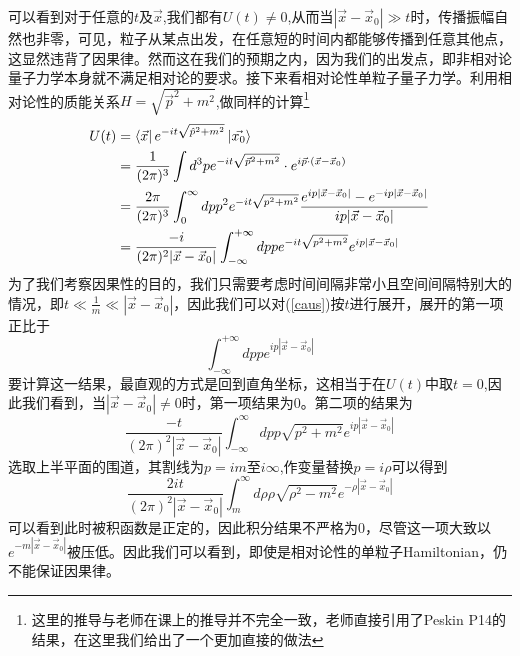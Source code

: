 可以看到对于任意的$t$及$\vec{x}$,我们都有$U(t)\neq0$,从而当$|\vec{x}-\vec{x}_{0}| \gg t$时，传播振幅自然也非零，可见，粒子从某点出发，在任意短的时间内都能够传播到任意其他点，这显然违背了因果律。然而这在我们的预期之内，因为我们的出发点，即非相对论量子力学本身就不满足相对论的要求。接下来看相对论性单粒子量子力学。利用相对论性的质能关系$H=\sqrt{\vec{p}^{2}+m^{2}}$,做同样的计算\footnote{这里的推导与老师在课上的推导并不完全一致，老师直接引用了Peskin P14的结果，在这里我们给出了一个更加直接的做法}
\begin{equation}
\label{caus}
\begin{aligned}
U(t) &=\bra{\vec{x}}e^{-it\sqrt{\hat{p}^{2}+m^{2}}}\ket{\vec{x_{0}}} \\
&=\frac{1}{(2\pi)^{3}}\int d^{3}p e^{-it\sqrt{\vec{p}^{2}+m^{2}}}\cdot e^{i\vec{p}\cdot(\vec{x}-\vec{x}_{0})} \\
&=\frac{2\pi}{(2\pi)^{3}}\int_{0}^{\infty}dp p^{2}  e^{-it\sqrt{p^{2}+m^{2}}} \frac{e^{ip|\vec{x}-\vec{x}_{0}|}-e^{-ip|\vec{x}-\vec{x}_{0}|}}{ip|\vec{x}-\vec{x}_{0}|}\\
&=\frac{-i}{(2\pi)^{2}|\vec{x}-\vec{x}_{0}|}\int_{-\infty}^{+\infty}dp p e^{-it\sqrt{p^{2}+m^{2}}}e^{ip|\vec{x}-\vec{x}_{0}|}
\end{aligned}
\end{equation}
为了我们考察因果性的目的，我们只需要考虑时间间隔非常小且空间间隔特别大的情况，即$t \ll \frac{1}{m} \ll |\vec{x}-\vec{x}_{0}|$，因此我们可以对(\ref{caus})按$t$进行展开，展开的第一项正比于
\begin{equation}
    \int_{-\infty}^{+\infty}dp p e^{ip|\vec{x}-\vec{x}_{0}|}
\end{equation}
要计算这一结果，最直观的方式是回到直角坐标，这相当于在$U(t)$中取$t=0$,因此我们看到，当$|\vec{x}-\vec{x}_{0}| \neq 0$时，第一项结果为0。第二项的结果为
\begin{equation}
\label{chap1calcu}
    \frac{-t}{(2\pi)^{2}|\vec{x}-\vec{x}_{0}|}\int_{-\infty}^{\infty}dp p \sqrt{p^{2}+m^{2}}e^{ip|\vec{x}-\vec{x}_{0}|}
\end{equation}
选取上半平面的围道，其割线为$p=im$至$i\infty$,作变量替换$p=i\rho$可以得到
\begin{equation}
    \frac{2it}{(2\pi)^{2}|\vec{x}-\vec{x}_{0}|}\int_{m}^{\infty}d\rho \rho \sqrt{\rho^{2}-m^{2}}e^{-\rho|\vec{x}-\vec{x}_{0}|}
\end{equation}
可以看到此时被积函数是正定的，因此积分结果不严格为0，尽管这一项大致以$e^{-m|\vec{x}-\vec{x}_{0}|}$被压低。因此我们可以看到，即使是相对论性的单粒子Hamiltonian，仍不能保证因果律。

